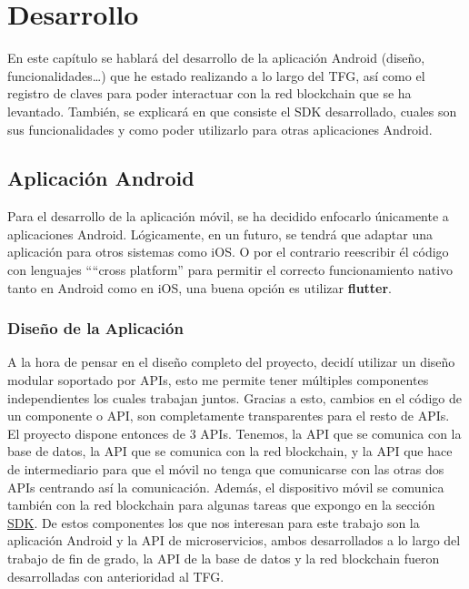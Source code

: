 \chapter{Desarrollo}
\label{cap:Desarrollo}

\setlength{\parindent}{0pt}

En este capítulo se hablará del desarrollo de la aplicación Android (diseño, funcionalidades\dots) que he estado realizando a lo largo del TFG, así como el registro de claves para poder interactuar con la red blockchain que se ha levantado. También, se explicará en que consiste el SDK desarrollado, cuales son sus funcionalidades y como poder utilizarlo para otras aplicaciones Android.

\section{Aplicación Android}

Para el desarrollo de la aplicación móvil, se ha decidido enfocarlo únicamente a aplicaciones Android. Lógicamente, en un futuro, se tendrá que adaptar una aplicación para otros sistemas como iOS. O por el contrario reescribir él código con lenguajes ````cross platform'' para permitir el correcto funcionamiento nativo tanto en Android como en iOS, una buena opción es utilizar \textbf{flutter}\cite{flutter}.

\subsection{Diseño de la Aplicación}

A la hora de pensar en el diseño completo del proyecto, decidí utilizar un diseño modular soportado por APIs, esto me permite tener múltiples componentes independientes los cuales trabajan juntos. Gracias a esto, cambios en el código de un componente o API, son completamente transparentes para el resto de APIs. El proyecto dispone entonces de 3 APIs. Tenemos, la API que se comunica con la base de datos, la API que se comunica con la red blockchain, y la API que hace de intermediario para que el móvil no tenga que comunicarse con las otras dos APIs centrando así la comunicación. Además, el dispositivo móvil se comunica también con la red blockchain para algunas tareas que expongo en la sección \hyperref[sec:SDK]{SDK}. De estos componentes los que nos interesan para este trabajo son la aplicación Android y la API de microservicios, ambos desarrollados a lo largo del trabajo de fin de grado, la API de la base de datos y la red blockchain fueron desarrolladas con anterioridad al TFG. 


